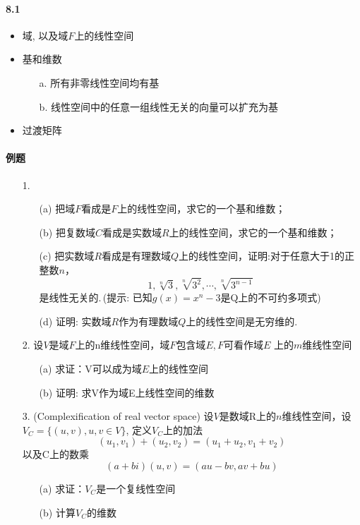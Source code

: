 \paragraph{8.1}
\begin{itemize}
    \item 域, 以及域$F$上的线性空间
    \item 基和维数
    \begin{itemize}
		\item[a.] 所有非零线性空间均有基
		\item[b.] 线性空间中的任意一组线性无关的向量可以扩充为基
	\end{itemize}
    \item 过渡矩阵
\end{itemize}

\paragraph{例题}
\begin{itemize}
  \item[1.]
  \begin{itemize}
    \item [(a)] 把域$F$看成是$F$上的线性空间，求它的一个基和维数；
    \item [(b)] 把复数域$C$看成是实数域$R$上的线性空间，求它的一个基和维数；
    \item [(c)] 把实数域$R$看成是有理数域$Q$上的线性空间，证明:对于任意大于1的正整数$n$，
  $$1, \sqrt[n]{3}, \sqrt[n]{3^2}, \cdots, \sqrt[n]{3^{n-1}}$$
  是线性无关的.\,(提示: 已知$g(x) = x^n-3$是Q上的不可约多项式)
    \item [(d)] 证明: 实数域$R$作为有理数域$Q$上的线性空间是无穷维的.
\end{itemize}
\end{itemize}
\vspace{2cm}

\begin{itemize}
  \item[2.] 设$V$是域$F$上的n维线性空间，域$F$包含域$E$,\,$F$可看作域$E$
  上的$m$维线性空间
  \begin{itemize}
    \item [(a)] 求证：V可以成为域$E$上的线性空间
    \item [(b)] 证明: 求V作为域E上线性空间的维数
  \end{itemize}
\end{itemize}
\vspace{1.5cm}

\begin{itemize}
  \item[3.] (Complexification of real vector space)
  设$V$是数域R上的$n$维线性空间，设$V_C = \{(u,v), u,v\in V\}$,
  定义$V_C$上的加法
  $$(u_1,v_1) +(u_2, v_2) = (u_1+u_2, v_1+v_2)$$
  以及C上的数乘
  $$(a+bi)(u,v)=(au-bv, av+bu)$$
  \begin{itemize}
    \item [(a)] 求证：$V_C$是一个复线性空间
    \item [(b)] 计算$V_C$的维数
  \end{itemize}
\end{itemize}
\vspace{1cm}

